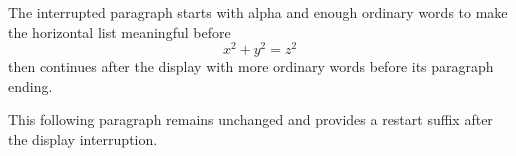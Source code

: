 
\hsize=220pt \vsize=240pt
The interrupted paragraph starts with alpha and enough ordinary words to make the horizontal list meaningful before
$$x^2+y^2=z^2$$
then continues after the display with more ordinary words before its paragraph ending.

This following paragraph remains unchanged and provides a restart suffix after the display interruption.
\bye
